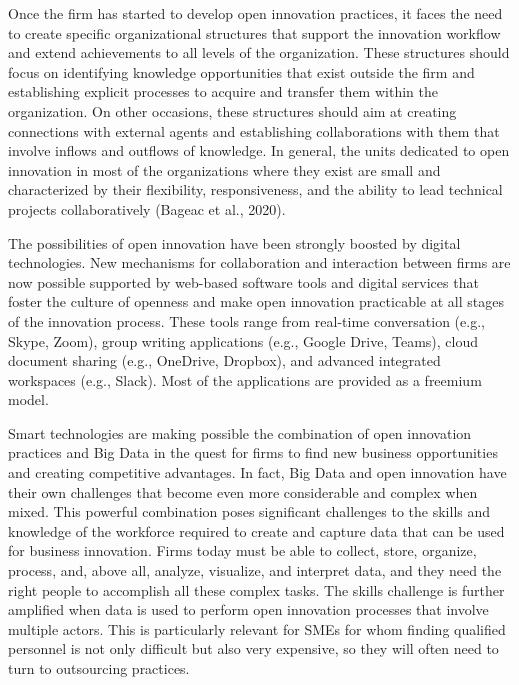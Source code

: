 \documentclass[
  letterpaper,
  DIV=11,
  numbers=noendperiod]{scrreprt}
\begin{document}
Once the firm has started to develop open innovation practices, it faces
the need to create specific organizational structures that support the
innovation workflow and extend achievements to all levels of the
organization. These structures should focus on identifying knowledge
opportunities that exist outside the firm and establishing explicit
processes to acquire and transfer them within the organization. On other
occasions, these structures should aim at creating connections with
external agents and establishing collaborations with them that involve
inflows and outflows of knowledge. In general, the units dedicated to
open innovation in most of the organizations where they exist are small
and characterized by their flexibility, responsiveness, and the ability
to lead technical projects collaboratively (Bageac et al., 2020).

The possibilities of open innovation have been strongly boosted by
digital technologies. New mechanisms for collaboration and interaction
between firms are now possible supported by web-based software tools and
digital services that foster the culture of openness and make open
innovation practicable at all stages of the innovation process. These
tools range from real-time conversation (e.g., Skype, Zoom), group
writing applications (e.g., Google Drive, Teams), cloud document sharing
(e.g., OneDrive, Dropbox), and advanced integrated workspaces (e.g.,
Slack). Most of the applications are provided as a freemium model.

Smart technologies are making possible the combination of open
innovation practices and Big Data in the quest for firms to find new
business opportunities and creating competitive advantages. In fact, Big
Data and open innovation have their own challenges that become even more
considerable and complex when mixed. This powerful combination poses
significant challenges to the skills and knowledge of the workforce
required to create and capture data that can be used for business
innovation. Firms today must be able to collect, store, organize,
process, and, above all, analyze, visualize, and interpret data, and
they need the right people to accomplish all these complex tasks. The
skills challenge is further amplified when data is used to perform open
innovation processes that involve multiple actors. This is particularly
relevant for SMEs for whom finding qualified personnel is not only
difficult but also very expensive, so they will often need to turn to
outsourcing practices.
\end{document}
